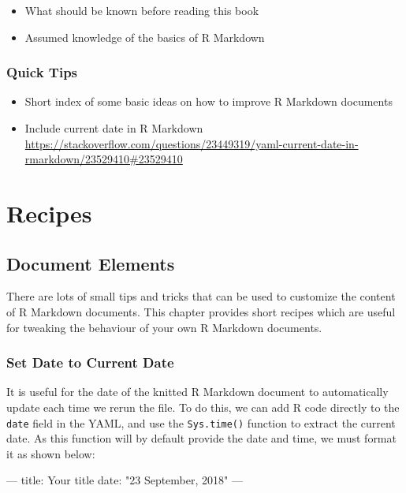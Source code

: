 \documentclass[]{book}
\newenvironment{Shaded}{\begin{snugshade}}{\end{snugshade}}
\newcommand{\AttributeTok}[1]{\textcolor[rgb]{0.77,0.63,0.00}{#1}}
\newcommand{\FunctionTok}[1]{\textcolor[rgb]{0.00,0.00,0.00}{#1}}
\newcommand{\OtherTok}[1]{\textcolor[rgb]{0.56,0.35,0.01}{#1}}
\newcommand{\StringTok}[1]{\textcolor[rgb]{0.31,0.60,0.02}{#1}}
\providecommand{\tightlist}{%
  \setlength{\itemsep}{0pt}\setlength{\parskip}{0pt}}
\theoremstyle{definition}
\theoremstyle{definition}
\theoremstyle{definition}
\theoremstyle{remark}
\begin{document}
\begin{itemize}
\tightlist
\item
  What should be known before reading this book
\item
  Assumed knowledge of the basics of R Markdown
\end{itemize}

\hypertarget{quick-tips}{%
\section{Quick Tips}\label{quick-tips}}

\begin{itemize}
\item
  Short index of some basic ideas on how to improve R Markdown documents
\item
  Include current date in R Markdown
  \url{https://stackoverflow.com/questions/23449319/yaml-current-date-in-rmarkdown/23529410\#23529410}
\end{itemize}

\hypertarget{part-recipes}{%
\part{Recipes}\label{part-recipes}}

\hypertarget{document-elements}{%
\chapter{Document Elements}\label{document-elements}}

There are lots of small tips and tricks that can be used to customize
the content of R Markdown documents. This chapter provides short recipes
which are useful for tweaking the behaviour of your own R Markdown
documents.

\hypertarget{set-date-to-current-date}{%
\section{Set Date to Current Date}\label{set-date-to-current-date}}

It is useful for the date of the knitted R Markdown document to
automatically update each time we rerun the file. To do this, we can add
R code directly to the \texttt{date} field in the YAML, and use the
\texttt{Sys.time()} function to extract the current date. As this
function will by default provide the date and time, we must format it as
shown below:

\begin{Shaded}
\begin{Highlighting}[]
\OtherTok{---}
\FunctionTok{title:}\AttributeTok{ Your title}
\FunctionTok{date:}\AttributeTok{ }\StringTok{"23 September, 2018"}
\OtherTok{---}
\end{Highlighting}
\end{Shaded}
\end{document}
